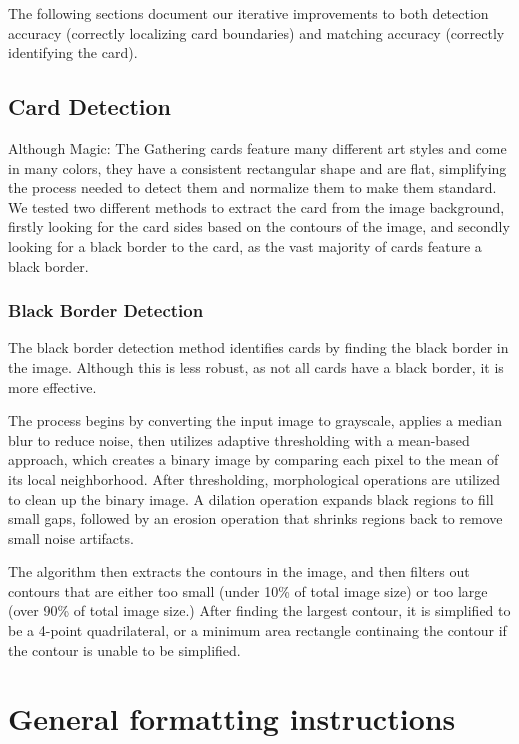 \documentclass{article} %
\begin{document}
The following sections document our iterative improvements to both detection accuracy (correctly localizing card boundaries)
and matching accuracy (correctly identifying the card).

\subsection{Card Detection}
Although Magic: The Gathering cards feature many different art styles and come in many colors, they have a consistent 
rectangular shape and are flat, simplifying the process needed to detect them and normalize them to make them standard. 
We tested two different methods to extract the card from the image background, firstly looking for the card sides based 
on the contours of the image, and secondly looking for a black border to the card, as the vast majority of cards feature 
a black border.

\subsubsection{Black Border Detection}

The black border detection method identifies cards by finding the black border in the image. Although this is less robust, 
as not all cards have a black border, it is more effective.

The process begins by converting the input image to grayscale, applies a median blur to reduce noise, then utilizes adaptive 
thresholding with a mean-based approach, which creates a binary image by comparing each pixel to the mean of its local 
neighborhood. After thresholding, morphological operations are utilized to clean up the binary image. A dilation operation 
expands black regions to fill small gaps, followed by an erosion operation that shrinks regions back to remove small noise 
artifacts. 

The algorithm then extracts the contours in the image, and then filters out contours that are either too small (under 10\% 
of total image size) or too large (over 90\% of total image size.) After finding the largest contour, it is simplified to 
be a 4-point quadrilateral, or a minimum area rectangle continaing the contour if the contour is unable to be simplified.

\section{General formatting instructions}
\label{gen_inst}
\end{document}
